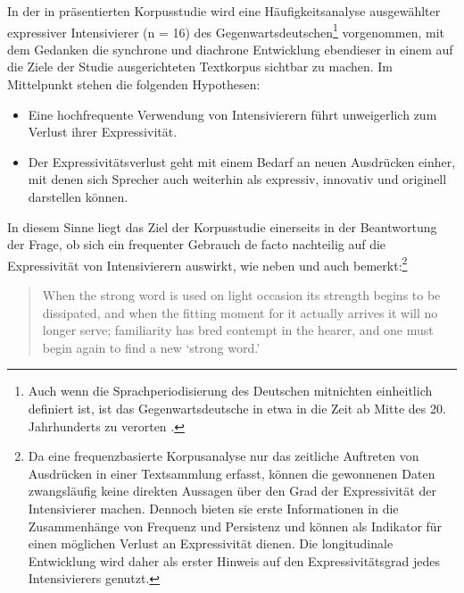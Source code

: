 In der in  präsentierten Korpusstudie wird eine Häufigkeitsanalyse ausgewählter expressiver Intensivierer (n = 16) des Gegenwartsdeutschen\footnote{Auch wenn die Sprachperiodisierung des Deutschen mitnichten einheitlich definiert ist, ist das Gegenwartsdeutsche in etwa in die Zeit ab Mitte des 20. Jahrhunderts zu verorten \citep[vgl.][3]{Elspass.2008}.} vorgenommen, mit dem Gedanken die synchrone und diachrone Entwicklung ebendieser in einem auf die Ziele der Studie ausgerichteten Textkorpus sichtbar zu machen. Im Mittelpunkt stehen die folgenden Hypothesen:

\begin{itemize}
\item[\textbf{\textsc{H1}}] Eine hochfrequente Verwendung von Intensivierern führt unweigerlich zum Verlust ihrer Expressivität.

\item[\textbf{\textsc{H2}}] Der Expressivitätsverlust geht mit einem Bedarf an neuen Ausdrücken einher, mit denen sich Sprecher auch weiterhin als expressiv, innovativ und originell darstellen können.
\end{itemize}

\noindent In diesem Sinne liegt das Ziel der Korpusstudie einerseits in der Beantwortung der Frage, ob sich ein frequenter Gebrauch de facto nachteilig auf die Expressivität von Intensivierern auswirkt, wie neben \citet[]{Hauschild.1899} und {\citet[]{Keller.1995}} auch \citet[]{Robertson.1954} bemerkt:\footnote{Da eine frequenzbasierte Korpusanalyse nur das zeitliche Auftreten von Ausdrücken in einer Textsammlung erfasst, können die gewonnenen Daten zwangsläufig keine direkten Aussagen über den Grad der Expressivität der Intensivierer machen. Dennoch bieten sie erste Informationen in die Zusammenhänge von Frequenz und Persistenz und können als Indikator für einen möglichen Verlust an Expressivität dienen. Die longitudinale Entwicklung wird daher als erster Hinweis auf den Expressivitätsgrad jedes Intensivierers genutzt.}

\begin{quotation} When the strong word is used on light occasion its strength begins to be dissipated, and when the fitting moment for it actually arrives it will no longer serve; familiarity has bred contempt in the hearer, and one must begin again to find a new `strong word.' \hfill \citep[251]{Robertson.1954} \\ \end{quotation} 

